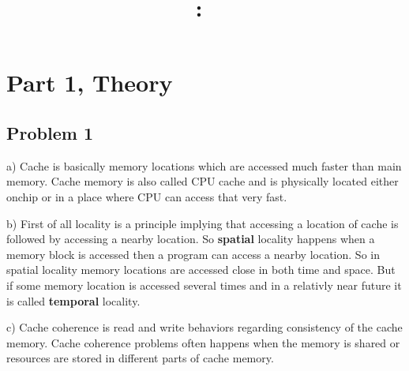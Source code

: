 \documentclass{article}
\title{
\vspace{2in}
\textmd{\textbf{\hmwkClass:\ \hmwkTitle}}\\
\normalsize\vspace{0.1in}\normalsize{\hmwkDueDate}
\vspace{0.1in}\large{\text{Parallel Computing}}
\vspace{3in}
}
\author{\textbf{\hmwkAuthorName}}
\date{} %
\begin{document}
\maketitle

\setcounter{tocdepth}{1} %



\clearpage

\section{Part 1, Theory}
\subsection{Problem 1}
\begin{flushleft}
a) Cache is basically memory locations which are accessed much faster than main memory. Cache memory is also called CPU cache and is physically located either onchip or in a place where CPU can access that very fast.

\end{flushleft}
\begin{flushleft}
b) First of all locality is a principle implying that accessing a location of cache is followed by accessing a nearby location. So \textbf{spatial} locality happens when a memory block is accessed then a program can access a nearby location. So in spatial locality memory locations are accessed close in both time and space. But if some memory location is accessed several times and in a relativly near future it is called \textbf{temporal} locality.
\end{flushleft}

\begin{flushleft}
c) Cache coherence is read and write behaviors regarding consistency of the cache memory. Cache coherence problems often happens when the memory is shared or resources are stored in different parts of cache memory.
\end{flushleft}
\end{document}
